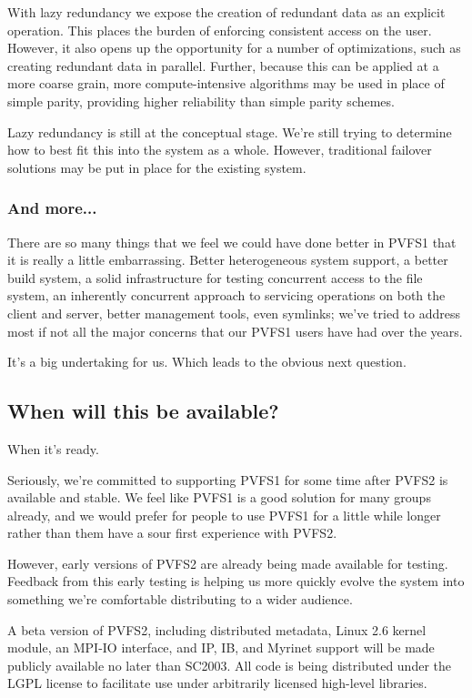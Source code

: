 With lazy redundancy we expose the creation of redundant data as an explicit
operation.  This places the burden of enforcing consistent access on the
user.  However, it also opens up the opportunity for a number of
optimizations, such as creating redundant data in parallel.  Further, because
this can be applied at a more coarse grain, more compute-intensive algorithms
may be used in place of simple parity, providing higher reliability than
simple parity schemes.

Lazy redundancy is still at the conceptual stage.  We're still trying to
determine how to best fit this into the system as a whole.  However,
traditional failover solutions may be put in place for the existing system.

\subsubsection{And more...}

There are so many things that we feel we could have done better in PVFS1 that
it is really a little embarrassing.  Better heterogeneous system support, a
better build system, a solid infrastructure for testing concurrent access to
the file system, an inherently concurrent approach to servicing operations on
both the client and server, better management tools, even symlinks; we've
tried to address most if not all the major concerns that our PVFS1 users have
had over the years.

It's a big undertaking for us.  Which leads to the obvious next question.

\subsection{When will this be available?}

When it's ready.

Seriously, we're committed to supporting PVFS1 for some time after PVFS2 is
available and stable.  We feel like PVFS1 is a good solution for many groups
already, and we would prefer for people to use PVFS1 for a little while longer
rather than them have a sour first experience with PVFS2.

However, early versions of PVFS2 are already being made available for
testing.  Feedback from this early testing is helping us more quickly evolve
the system into something we're comfortable distributing to a wider audience.

A beta version of PVFS2, including distributed metadata, Linux 2.6 kernel
module, an MPI-IO interface, and IP, IB, and Myrinet support will be made
publicly available no later than SC2003.  All code is being distributed under
the LGPL license to facilitate use under arbitrarily licensed high-level
libraries.
